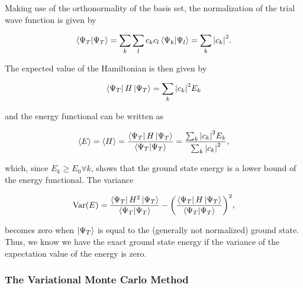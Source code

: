 Making use of the orthonormality of the basis set, the normalization of the trial wave function is given by

\begin{equation*}
    \braket{\Psi_T} = \sum_k\sum_l c_kc_l\braket{\Psi_k}{\Psi_l} = \sum_k \abs{c_k}^2.
\end{equation*}

The expected value of the Hamiltonian is then given by

\begin{equation*}\label{eq:energy_functional_basis_set}
    \bra{\Psi_T}H\ket{\Psi_T} = \sum_k\abs{c_k}^2E_k
\end{equation*}

and the energy functional can be written as 

\begin{equation}\label{eq:variational_expval}
    \expval{E} = \expval{H} = \frac{\bra{\Psi_T}H\ket{\Psi_T}}{\braket{\Psi_T}} = \frac{\sum_k\abs{c_k}^2E_k}{\sum_k\abs{c_k}^2}, 
\end{equation}

which, since $E_k\geq E_0 \forall k$, shows that the ground state energy is a lower bound of the energy functional. The variance


\begin{equation}\label{eq:variational_variance}
    \mathrm{Var}(E) = \frac{\bra{\Psi_T}H^2\ket{\Psi_T}}{\braket{\Psi_T}} -\qty(\frac{\bra{\Psi_T}H\ket{\Psi_T}}{\braket{\Psi_T}})^2,
\end{equation}

becomes zero when $\ket{\Psi_T}$ is equal to the (generally not normalized) ground state. Thus, we know we have the exact ground state energy if the variance of the expectation value of the energy is zero. 


\subsubsection{The Variational Monte Carlo Method}

